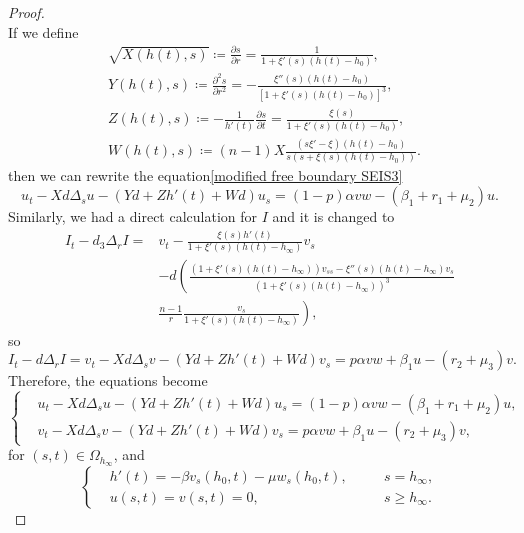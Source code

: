 \documentclass[10pt,a4paper]{amsart}
\begin{document}
\begin{proof}
\begin{equation}
\end{equation}
If we define
\begin{equation*}
	\begin{aligned}
		&\sqrt{X(h(t),s)}\coloneqq \frac{\partial s}{\partial r}=\frac{1}{1+\xi'(s)(h(t)-h_0)},
			\\
		&Y(h(t),s)\coloneqq \frac{\partial^2s}{\partial r^2}=-\frac{\xi''(s)(h(t)-h_0)}{[1+\xi'(s)(h(t)-h_0)]^3},
			\\
		&Z(h(t),s)\coloneqq -\frac{1}{h'(t)}\frac{\partial s}{\partial t}=\frac{\xi(s)}{1+\xi'(s)(h(t)-h_0)},
			\\
		&W(h(t),s)\coloneqq(n-1)X\frac{(s\xi'-\xi)(h(t)-h_0)}{s(s+\xi(s)(h(t)-h_0))}.\,
	\end{aligned}
\end{equation*}
then we can rewrite the equation\cref{modified free boundary SEIS3}
\begin{equation*}
	u_t-Xd\Delta_s u -(Yd+Zh'(t)+Wd)u_s=(1-p)\alpha vw-(\beta_1+r_1+\mu_2)u.
\end{equation*}
Similarly, we had a direct calculation for $I$ and it is changed to
\begin{equation*}
	\begin{aligned}
		I_t-d_3\Delta_r I=&v_t-\frac{\xi(s)h'(t)}{1+\xi'(s)(h(t)-h_\infty)}v_s\\
		&-d\left( \frac{(1+\xi'(s)(h(t)-h_\infty))v_{ss}-\xi''(s)(h(t)-h_\infty)v_s}{(1+\xi'(s)(h(t)-h_\infty))^3} \right. \\
		&\left. \frac{n-1}{r}\frac{v_s}{1+\xi'(s)(h(t)-h_\infty)} \right),
	\end{aligned}
\end{equation*}
so
\begin{equation*}
	I_t-d\Delta_r I = v_t-Xd\Delta_s v-(Yd+Zh'(t)+Wd)v_s=p\alpha vw+\beta_1u-(r_2+\mu_3)v.
\end{equation*}
Therefore, the equations become
\begin{equation*}
	\left \{ \begin{aligned}
		&u_t-Xd\Delta_s u-(Yd+Zh'(t)+Wd)u_s=(1-p)\alpha vw-(\beta_1+r_1+\mu_2)u,\\
		&v_t-Xd\Delta_s v-(Yd+Zh'(t)+Wd)v_s=p\alpha vw+\beta_1 u-(r_2+\mu_3)v,
	\end{aligned} \right.
\end{equation*}
for $(s,t)\in \Omega_{h_\infty}$, and
\begin{equation*}
	\left \{ \begin{aligned}
		&h'(t)=-\beta v_s(h_0,t)-\mu w_s(h_0,t), \quad &&s=h_\infty,\\
		&u(s,t)=v(s,t)=0, &&s\geq h_\infty.
	\end{aligned} \right.
\end{equation*}
\end{proof}
\end{document}
